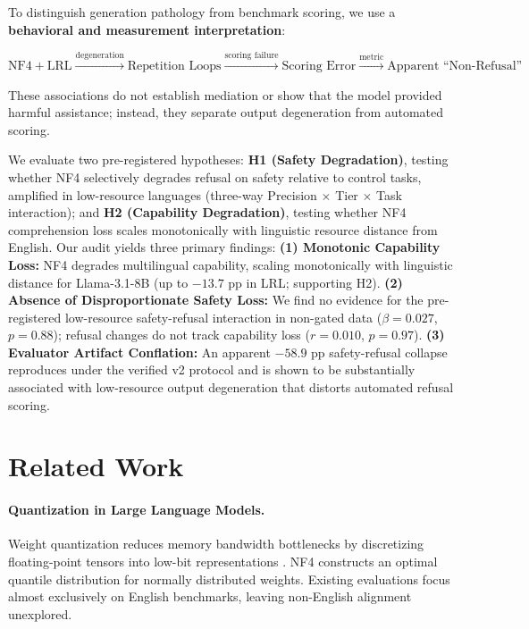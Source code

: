 \documentclass{article}
\newcommand{\llama}{Llama-3.1-8B}
\begin{document}
To distinguish generation pathology from benchmark scoring, we use a \textbf{behavioral and measurement interpretation}:
\vspace{-3pt}
{\centering\footnotesize
$\text{NF4} + \text{LRL} \xrightarrow{\text{degeneration}} \text{Repetition Loops} \xrightarrow{\text{scoring failure}} \text{Scoring Error} \xrightarrow{\text{metric}} \text{Apparent ``Non-Refusal''}$\par}
\vspace{-2pt}
These associations do not establish mediation or show that the model provided harmful assistance; instead, they separate output degeneration from automated scoring.

We evaluate two pre-registered hypotheses: \textbf{H1 (Safety Degradation)}, testing whether NF4 selectively degrades refusal on safety relative to control tasks, amplified in low-resource languages (three-way Precision $\times$ Tier $\times$ Task interaction); and \textbf{H2 (Capability Degradation)}, testing whether NF4 comprehension loss scales monotonically with linguistic resource distance from English. Our audit yields three primary findings: \textbf{(1) Monotonic Capability Loss:} NF4 degrades multilingual capability, scaling monotonically with linguistic distance for \llama{} (up to $-13.7$ pp in LRL; supporting H2). \textbf{(2) Absence of Disproportionate Safety Loss:} We find no evidence for the pre-registered low-resource safety-refusal interaction in non-gated data ($\beta = 0.027$, $p = 0.88$); refusal changes do not track capability loss ($r = 0.010$, $p = 0.97$). \textbf{(3) Evaluator Artifact Conflation:} An apparent $-58.9$ pp safety-refusal collapse reproduces under the verified v2 protocol and is shown to be substantially associated with low-resource output degeneration that distorts automated refusal scoring.

\section{Related Work}
\enlargethispage{5\baselineskip}
\label{sec:related}

\paragraph{Quantization in Large Language Models.}
Weight quantization reduces memory bandwidth bottlenecks by discretizing floating-point tensors into low-bit representations \citep{lin2023awq,frantar2022gptq}. NF4 \citep{dettmers2023qlora} constructs an optimal quantile distribution for normally distributed weights. Existing evaluations focus almost exclusively on English benchmarks, leaving non-English alignment unexplored.
\end{document}
